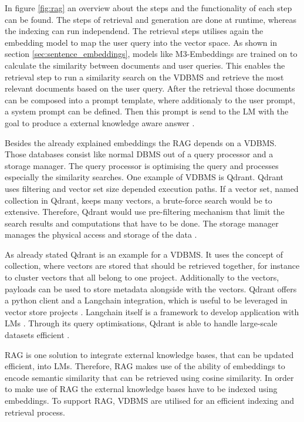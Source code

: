 \documentclass[a4paper,oneside,bibliography=totoc]{scrbook}
\begin{document}
In figure \ref{fig:rag} an overview about the steps and the functionality of each step can be found. The steps of retrieval and generation are done at runtime, whereas the indexing can run independend. The retrieval steps utilises again the embedding model to map the user query into the vector space. As shown in section \ref{sec:sentence_embeddings}, models like M3-Embeddings are trained on to calculate the similarity between documents and user queries. This enables the retrieval step to run a similarity search on the \ac{VDBMS} and retrieve the most relevant documents based on the user query. After the retrieval those documents can be composed into a prompt template, where additionaly to the user prompt, a system prompt can be defined. Then this prompt is send to the \ac{LM} with the goal to produce a external knowledge aware answer \cite{Gao2024}.

Besides the already explained embeddings the \ac{RAG} depends on a \ac{VDBMS}. Those databases consist like normal \ac{DBMS} out of a query processor and a storage manager. The query processor is optimising the query and processes especially the similarity searches. One example of \ac{VDBMS} is Qdrant. Qdrant uses filtering and vector set size depended execution paths. If a vector set, named collection in Qdrant, keeps many vectors, a brute-force search would be to extensive. Therefore, Qdrant would use pre-filtering mechanism that limit the search results and computations that have to be done. The storage manager manages the physical access and storage of the data \cite{Pan2024}.

As already stated Qdrant is an example for a \ac{VDBMS}. It uses the concept of collection, where vectors are stored that should be retrieved together, for instance to cluster vectors that all belong to one project. Additionally to the vectors, payloads can be used to store metadata alongside with the vectors. Qdrant offers a python client and a Langchain integration, which is useful to be leveraged in vector store projects \cite{Qdrant2025}. Langchain itself is a framework to develop application with \acp{LM} \cite{LangChain2025d}. Through its query optimisations, Qdrant is able to handle large-scale datasets efficient \cite{Qdrant2025,Pan2024}.

\ac{RAG} is one solution to integrate external knowledge bases, that can be updated efficient, into \acp{LM}. Therefore, \ac{RAG} makes use of the ability of embeddings to encode semantic similarity that can be retrieved using cosine similarity. In order to make use of \ac{RAG} the external knowledge bases have to be indexed using embeddings. To support \ac{RAG}, \ac{VDBMS} are utilised for an efficient indexing and retrieval process.
\end{document}
